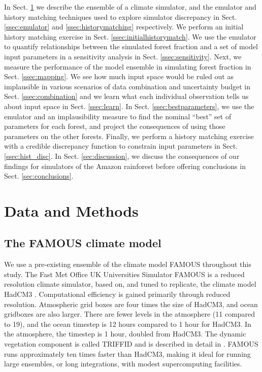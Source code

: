 \documentclass[esd, article]{copernicus} %
\begin{document}
In Sect. \ref{sec:dataandmethods} we describe the ensemble of a climate simulator, and the emulator and history matching techniques used to explore simulator discrepancy in Sect. \ref{ssec:emulator} and \ref{ssec:historymatching} respectively. We perform an initial history matching exercise in Sect. \ref{ssec:initialhistorymatch}. We use the emulator to quantify relationships between the simulated forest fraction and a set of model input parameters in a sensitivity analysis in Sect. \ref{ssec:sensitivity}. Next, we measure the performance of the model ensemble in simulating forest fraction in Sect. \ref{ssec:mapping}. We see how much input space would be ruled out as implausible in various scenarios of data combination and uncertainty budget in Sect. \ref{ssec:combination} and we learn what each individual observation tells us about input space in Sect. \ref{ssec:learn}. In Sect. \ref{ssec:bestparameters}, we use the emulator and an implausibility measure to find the nominal ``best'' set of parameters for each forest, and project the consequences of using those parameters on the other forests. Finally, we perform a history matching exercise with a credible discrepancy function to constrain input parameters in Sect. \ref{ssec:hist_disc}. In Sect. \ref{sec:discussion}, we discuss the consequences of our findings for simulators of the Amazon rainforest before offering conclusions in Sect. \ref{sec:conclusions}.


\section{Data and Methods}\label{sec:dataandmethods}

\subsection{The FAMOUS climate model}\label{subsec:FAMOUS}

We use a pre-existing ensemble of the climate model FAMOUS throughout this study. The Fast Met Office UK Universities Simulator FAMOUS \citep{jones2005systematic,smith2008famous} is a reduced resolution climate simulator, based on, and tuned to replicate, the climate model HadCM3 \citep{gordon2000simulation,pope2000impact}. Computational efficiency is gained primarily through reduced resolution. Atmospheric grid boxes are four times the size of HadCM3, and ocean gridboxes are also larger. There are fewer levels in the atmosphere (11 compared to 19), and the ocean timestep is 12 hours compared to 1 hour for HadCM3. In the atmosphere, the timestep is 1 hour, doubled from HadCM3. The dynamic vegetation component is called TRIFFID and is described in detail in \cite{cox2001description}.  FAMOUS runs approximately ten times faster than HadCM3, making it ideal for running large ensembles, or long integrations, with modest supercomputing facilities.
\end{document}
